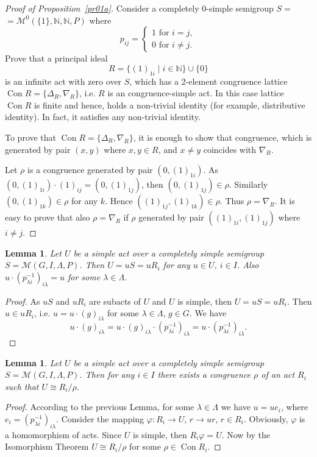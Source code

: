 \documentclass{birkau}
\numberwithin{equation}{section}
\theoremstyle{plain}
\newtheorem{lemma}[theorem]{Lemma}
\theoremstyle{definition}
\DeclareMathOperator{\Con}{Con}
\begin{document}
	\begin{proof}[Proof of Proposition~\ref{pr01a}]
	    Consider a completely 0-simple semigroup $S = $ \newline $ = \mathcal{M}^0(\{1\},\mathbb{N},\mathbb{N},P)$ where
	    $$ p_{ij} =
			\begin{cases}
				1 \text{ for } i = j,\\
				0 \text{ for } i \neq j.
			\end{cases}
		$$
		Prove that a principal ideal $$ R = \{ (1)_{1i} \mid i \in \mathbb{N} \} \cup \{0\} $$ is an infinite act with zero over $S$, which has a 2-element congruence lattice  $\Con R = \{ \Delta_R, \nabla_R\}$, i.e. $R$ is an congruence-simple act. In this case lattice $\Con R$ is finite and hence, holds a non-trivial identity (for example, distributive identity). In fact, it satisfies any non-trivial identity.
		
		To prove that $\Con R = \{ \Delta_R, \nabla_R \}$, it is enough to show that congruence, which is generated by pair $(x,y)$ where $x,y \in R$, and $x \neq y$ coincides with $\nabla_R$.
		
		Let $\rho$ is a congruence generated by pair $(0,(1)_{1i})$. As $(0,(1)_{1i}) \cdot (1)_{ij} = (0,(1)_{1j})$, then $(0,(1)_{1j}) \in \rho$. Similarly $(0,(1)_{1k}) \in \rho$ for any $k$. Hence  \newline $((1)_{1j},(1)_{1k}) \in \rho$. Thus $\rho = \nabla_R$. It is easy to prove that also $\rho = \nabla_R$ if $\rho$ generated by pair $((1)_{1i},(1)_{1j})$ where $i \neq j$.
	\end{proof}
	
	\begin{lemma}   \label{l2.1}
	    Let $U$ be a simple act over a completely simple semigroup $S = \mathcal{M}(G,I,\Lambda,P)$. Then $U = uS = u R_i$ for any $u \in U$, $i \in I$. Also $u \cdot
	    {(p_{\lambda i}^{-1})}_{i \lambda} = u$ for some $\lambda \in \Lambda$.
	\end{lemma}
	\begin{proof}
	    As $uS$ and $uR_i$ are subacts of $U$ and $U$ is simple, then $U = uS = u R_i$. Then $u \in u R_i$, i.e. $u = u \cdot (g)_{i \lambda}$ for some $\lambda \in \Lambda$, $g \in G$. We have $$ u \cdot {(g)}_{i \lambda} = u \cdot (g)_{i \lambda} \cdot {(p_{\lambda i}^{-1})}_{i \lambda} = u \cdot {(p_{\lambda i}^{-1})}_{i \lambda}.$$
	\end{proof}
	
	\begin{lemma} \label{l2.2}
	    Let $U$ be a simple act over a completely simple semigroup $S = \mathcal{M}(G,I,\Lambda,P)$. Then for any $i \in I$ there exists a congruence $\rho$ of an act $R_i$ such that $U \cong {R_i}/{\rho}$.
	\end{lemma}
	\begin{proof}
	    According to the previous Lemma, for some $\lambda \in \Lambda$ we have $u = u e_i$, where $e_i = (p_{\lambda i}^{-1})_{i \lambda}$. Consider the mapping $\varphi: R_i \rightarrow U$, $r \rightarrow ur$, $r \in R_i$. Obviously, $\varphi$ is a homomorphism of acts. Since $U$ is simple, then $R_i \varphi = U$. Now by the Isomorphism Theorem $U \cong {R_i}/{\rho}$ for some $\rho \in \Con R_i$.
	\end{proof}
	
\end{document}

